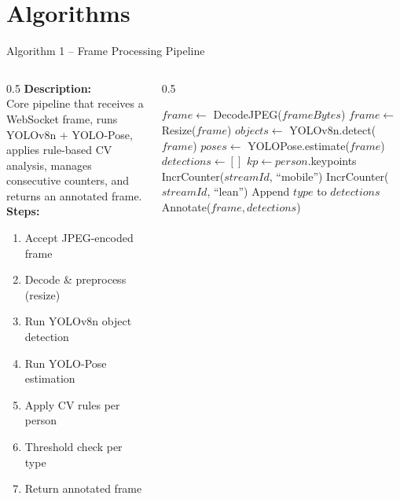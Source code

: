 \documentclass{beamer}
\begin{document}
\section{Algorithms}

\begin{frame}{Algorithm 1 -- Frame Processing Pipeline}
\begin{columns}
\begin{column}{0.5\textwidth}
\footnotesize
\textbf{Description:}\\
Core pipeline that receives a WebSocket frame, runs YOLOv8n + YOLO-Pose, applies rule-based CV analysis, manages consecutive counters, and returns an annotated frame.\\[0.3cm]
\textbf{Steps:}
\begin{enumerate}\footnotesize
    \item Accept JPEG-encoded frame
    \item Decode \& preprocess (resize)
    \item Run YOLOv8n object detection
    \item Run YOLO-Pose estimation
    \item Apply CV rules per person
    \item Threshold check per type
    \item Return annotated frame
\end{enumerate}
\end{column}
\begin{column}{0.5\textwidth}
\begin{algorithmic}[1]
\footnotesize
{}
  \State $frame \gets$ DecodeJPEG($frameBytes$)
  \State $frame \gets$ Resize($frame$)
  \State $objects \gets$ YOLOv8n.detect($frame$)
  \State $poses \gets$ YOLOPose.estimate($frame$)
  \State $detections \gets []$
    \State $kp \gets person$.keypoints
      \State IncrCounter($streamId$, ``mobile'')
    \EndIf
      \State IncrCounter($streamId$, ``lean'')
    \EndIf
        \State Append $type$ to $detections$
      \EndIf
    \EndFor
  \EndFor
  \State \Return Annotate($frame, detections$)
\EndFunction
\end{algorithmic}
\end{column}
\end{columns}
\end{frame}
\end{document}
